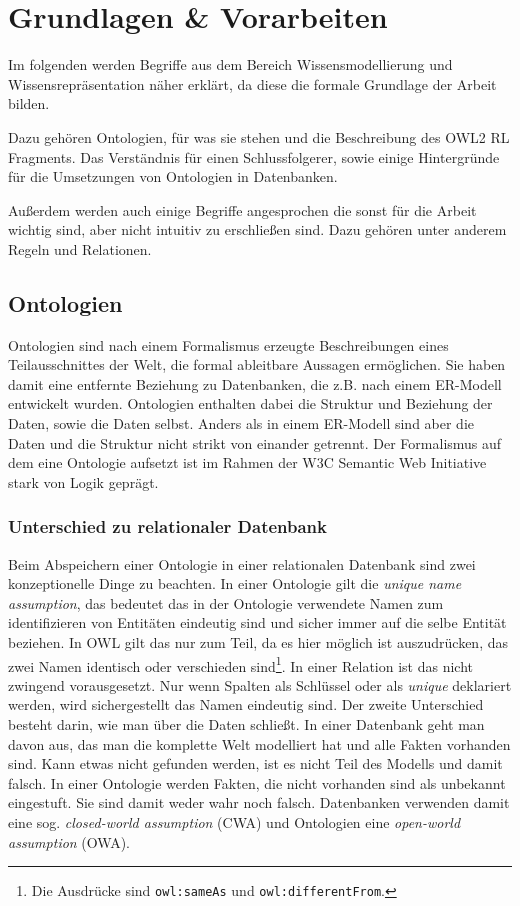 \chapter{Grundlagen \& Vorarbeiten}
\label{kapitel-grundlagen}
Im folgenden werden Begriffe aus dem Bereich Wissensmodellierung und Wissensrepräsentation näher erklärt, da diese die formale Grundlage der Arbeit bilden.

Dazu gehören Ontologien, für was sie stehen und die Beschreibung des OWL2 RL Fragments. Das Verständnis für einen Schlussfolgerer, sowie einige Hintergründe für die Umsetzungen von Ontologien in Datenbanken.

Außerdem werden auch einige Begriffe angesprochen die sonst für die Arbeit wichtig sind, aber nicht intuitiv zu erschließen sind. Dazu gehören unter anderem Regeln und Relationen.

\section{Ontologien}

Ontologien sind nach einem Formalismus erzeugte Beschreibungen eines Teilausschnittes der Welt, die formal ableitbare Aussagen ermöglichen. Sie haben damit eine entfernte Beziehung zu Datenbanken, die z.B. nach einem ER-Modell entwickelt wurden. Ontologien enthalten dabei die Struktur und Beziehung der Daten, sowie die Daten selbst. Anders als in einem ER-Modell sind aber die Daten und die Struktur nicht strikt von einander getrennt. Der Formalismus auf dem eine Ontologie aufsetzt ist im Rahmen der W3C Semantic Web Initiative stark von Logik geprägt. \cite{Hesse2002}

\subsection{Unterschied zu relationaler Datenbank}

Beim Abspeichern einer Ontologie in einer relationalen Datenbank sind zwei konzeptionelle Dinge zu beachten. In einer Ontologie gilt die \emph{unique name assumption}, das bedeutet das in der Ontologie verwendete Namen zum identifizieren von Entitäten eindeutig sind und sicher immer auf die selbe Entität beziehen. In OWL gilt das nur zum Teil, da es hier möglich ist auszudrücken, das zwei Namen identisch oder verschieden sind\cite{OWL1}\footnote{Die Ausdrücke sind \texttt{owl:sameAs} und \texttt{owl:differentFrom}.}. In einer Relation ist das nicht zwingend vorausgesetzt. Nur wenn Spalten als Schlüssel oder als \emph{unique} deklariert werden, wird sichergestellt das Namen eindeutig sind.
Der zweite Unterschied besteht darin, wie man über die Daten schließt. In einer Datenbank geht man davon aus, das man die komplette Welt modelliert hat und alle Fakten vorhanden sind. Kann etwas nicht gefunden werden, ist es nicht Teil des Modells und damit falsch. In einer Ontologie werden Fakten, die nicht vorhanden sind als unbekannt eingestuft. Sie sind damit weder wahr noch falsch. Datenbanken verwenden damit eine sog. \emph{closed-world assumption} (CWA) und Ontologien eine \emph{open-world assumption} (OWA).

